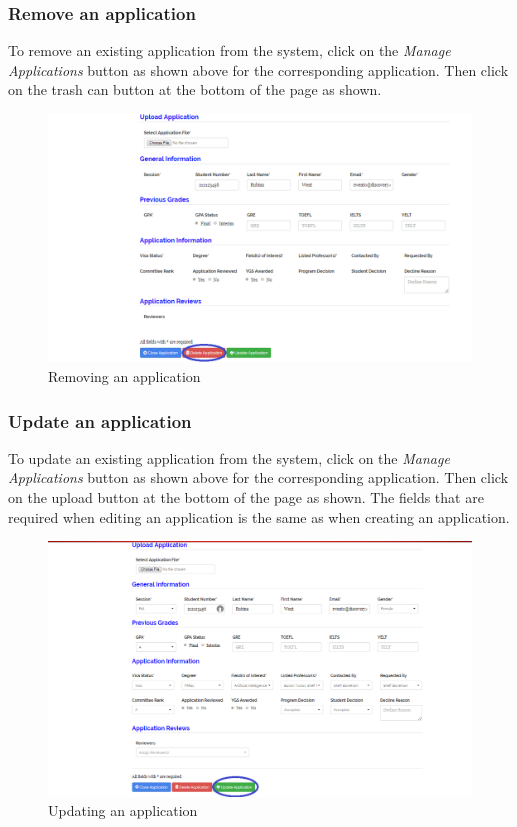 \documentclass[fontsize=12pt,paper=letter,twoside]{scrartcl}
\begin{document}
\clearpage
\subsubsection{Remove an application}
To remove an existing application from the system, click on the \emph{Manage Applications} button as shown above for the corresponding application. Then click on the trash can button at the bottom of the page as shown.

\begin{figure}[!htb]
\begin{center}
\includegraphics[width=.99\textwidth]{images/ma/remove_appl.png}
\end{center}
\caption{Removing an application}
\label{fig:remove_appl}
\end{figure}

\clearpage
\subsubsection{Update an application}
To update an existing application from the system, click on the \emph{Manage Applications} button as shown above for the corresponding application. Then click on the upload button at the bottom of the page as shown. The fields that are required when editing an application is the same as when creating an application.

\begin{figure}[!htb]
\begin{center}
\includegraphics[width=.99\textwidth]{images/ma/update_appl.png}
\end{center}
\caption{Updating an application}
\label{fig:update_appl}
\end{figure}
\end{document}
